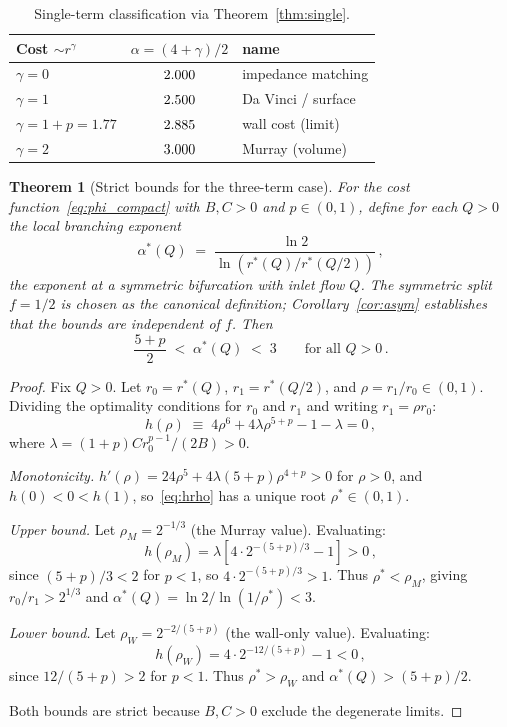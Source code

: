 \documentclass[11pt,a4paper]{article}
\newtheorem{theorem}{Theorem}
\theoremstyle{remark}
\begin{document}
\begin{table}[H]
\centering
\caption{Single-term classification via Theorem~\ref{thm:single}.}
\label{tab:classification}
\small
\begin{tabular}{@{}lcl@{}}
\toprule
Cost $\sim r^\gamma$ & $\alpha=(4+\gamma)/2$ & name \\
\midrule
$\gamma=0$ & $2.000$ & impedance matching \\
$\gamma=1$ & $2.500$ & Da Vinci / surface \\
$\gamma=1+p=1.77$ & $2.885$ & wall cost (limit) \\
$\gamma=2$ & $3.000$ & Murray (volume) \\
\bottomrule
\end{tabular}
\end{table}

\begin{theorem}[Strict bounds for the three-term case]
\label{thm:bounds}
For the cost function~\eqref{eq:phi_compact} with $B,C>0$ and $p\in(0,1)$,
define for each $Q>0$ the local branching exponent
\[
  \alpha^*(Q) \;=\; \frac{\ln 2}{\ln(r^*(Q)/r^*(Q/2))}\,,
\]
the exponent at a symmetric bifurcation with inlet flow $Q$.
The symmetric split $f=1/2$ is chosen as the canonical definition;
Corollary~\ref{cor:asym} establishes that the bounds are independent of $f$.
Then
\begin{equation}
  \frac{5+p}{2} \;<\; \alpha^*(Q) \;<\; 3 \qquad \text{for all }Q>0\,.
  \label{eq:bounds}
\end{equation}
\end{theorem}

\begin{proof}
Fix $Q>0$.
Let $r_0=r^*(Q)$, $r_1=r^*(Q/2)$, and $\rho=r_1/r_0\in(0,1)$.
Dividing the optimality conditions for $r_0$ and $r_1$ and writing $r_1=\rho
r_0$:
\begin{equation}
  h(\rho) \;\equiv\; 4\rho^6 + 4\lambda\rho^{5+p} - 1 - \lambda = 0\,,
  \label{eq:hrho}
\end{equation}
where $\lambda=(1+p)Cr_0^{p-1}/(2B)>0$.

\emph{Monotonicity.}
$h'(\rho)=24\rho^5+4\lambda(5+p)\rho^{4+p}>0$ for $\rho>0$,
and $h(0)<0<h(1)$, so~\eqref{eq:hrho} has a unique root $\rho^*\in(0,1)$.

\emph{Upper bound.}
Let $\rho_M=2^{-1/3}$ (the Murray value).
Evaluating:
\[
  h(\rho_M)=\lambda\!\left[4\cdot2^{-(5+p)/3}-1\right]>0\,,
\]
since $(5+p)/3<2$ for $p<1$, so $4\cdot2^{-(5+p)/3}>1$.
Thus $\rho^*<\rho_M$, giving $r_0/r_1>2^{1/3}$ and
$\alpha^*(Q)=\ln 2/\ln(1/\rho^*)<3$.

\emph{Lower bound.}
Let $\rho_W=2^{-2/(5+p)}$ (the wall-only value).
Evaluating:
\[
  h(\rho_W)=4\cdot2^{-12/(5+p)}-1<0\,,
\]
since $12/(5+p)>2$ for $p<1$.
Thus $\rho^*>\rho_W$ and $\alpha^*(Q)>(5+p)/2$.

Both bounds are strict because $B,C>0$ exclude the degenerate limits.
\end{proof}
\end{document}
